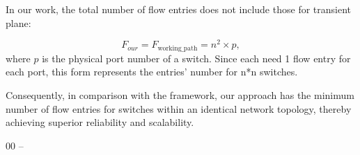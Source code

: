\documentclass[conference]{IEEEtran}
\begin{document}
In our work, the total number of flow entries does not include those for transient plane:

\begin{equation*}
    F_{our}=F_{\text{working\_path}} = n^2 \times p,
\end{equation*}
where $p$ is the physical port number of a switch. Since each need 1 flow entry for each port, this form represents the entries' number for n*n switches.

Consequently, in comparison with the framework, our approach has the minimum number of flow entries for switches within an identical network topology, thereby achieving superior reliability and scalability.






\begin{thebibliography}{00}
 --

\end{thebibliography}
\end{document}
